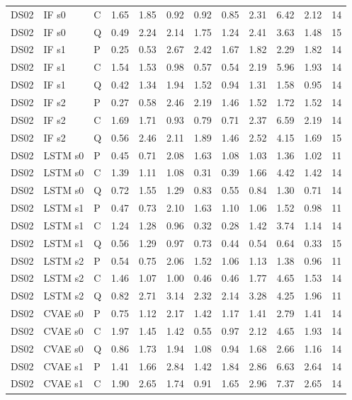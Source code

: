 \documentclass[10pt]{article}
\begin{document}
{\begin{longtable}{lllrrrrrrrrr}
DS02 & IF s0 & C & 1.65 & 1.85 & 0.92 & 0.92 & 0.85 & 2.31 & 6.42 & 2.12 & 14 \\
DS02 & IF s0 & Q & 0.49 & 2.24 & 2.14 & 1.75 & 1.24 & 2.41 & 3.63 & 1.48 & 15 \\
DS02 & IF s1 & P & 0.25 & 0.53 & 2.67 & 2.42 & 1.67 & 1.82 & 2.29 & 1.82 & 14 \\
DS02 & IF s1 & C & 1.54 & 1.53 & 0.98 & 0.57 & 0.54 & 2.19 & 5.96 & 1.93 & 14 \\
DS02 & IF s1 & Q & 0.42 & 1.34 & 1.94 & 1.52 & 0.94 & 1.31 & 1.58 & 0.95 & 14 \\
DS02 & IF s2 & P & 0.27 & 0.58 & 2.46 & 2.19 & 1.46 & 1.52 & 1.72 & 1.52 & 14 \\
DS02 & IF s2 & C & 1.69 & 1.71 & 0.93 & 0.79 & 0.71 & 2.37 & 6.59 & 2.19 & 14 \\
DS02 & IF s2 & Q & 0.56 & 2.46 & 2.11 & 1.89 & 1.46 & 2.52 & 4.15 & 1.69 & 15 \\
DS02 & LSTM s0 & P & 0.45 & 0.71 & 2.08 & 1.63 & 1.08 & 1.03 & 1.36 & 1.02 & 11 \\
DS02 & LSTM s0 & C & 1.39 & 1.11 & 1.08 & 0.31 & 0.39 & 1.66 & 4.42 & 1.42 & 14 \\
DS02 & LSTM s0 & Q & 0.72 & 1.55 & 1.29 & 0.83 & 0.55 & 0.84 & 1.30 & 0.71 & 14 \\
DS02 & LSTM s1 & P & 0.47 & 0.73 & 2.10 & 1.63 & 1.10 & 1.06 & 1.52 & 0.98 & 11 \\
DS02 & LSTM s1 & C & 1.24 & 1.28 & 0.96 & 0.32 & 0.28 & 1.42 & 3.74 & 1.14 & 14 \\
DS02 & LSTM s1 & Q & 0.56 & 1.29 & 0.97 & 0.73 & 0.44 & 0.54 & 0.64 & 0.33 & 15 \\
DS02 & LSTM s2 & P & 0.54 & 0.75 & 2.06 & 1.52 & 1.06 & 1.13 & 1.38 & 0.96 & 11 \\
DS02 & LSTM s2 & C & 1.46 & 1.07 & 1.00 & 0.46 & 0.46 & 1.77 & 4.65 & 1.53 & 14 \\
DS02 & LSTM s2 & Q & 0.82 & 2.71 & 3.14 & 2.32 & 2.14 & 3.28 & 4.25 & 1.96 & 11 \\
DS02 & CVAE s0 & P & 0.75 & 1.12 & 2.17 & 1.42 & 1.17 & 1.41 & 2.79 & 1.41 & 14 \\
DS02 & CVAE s0 & C & 1.97 & 1.45 & 1.42 & 0.55 & 0.97 & 2.12 & 4.65 & 1.93 & 14 \\
DS02 & CVAE s0 & Q & 0.86 & 1.73 & 1.94 & 1.08 & 0.94 & 1.68 & 2.66 & 1.16 & 14 \\
DS02 & CVAE s1 & P & 1.41 & 1.66 & 2.84 & 1.42 & 1.84 & 2.86 & 6.63 & 2.64 & 14 \\
DS02 & CVAE s1 & C & 1.90 & 2.65 & 1.74 & 0.91 & 1.65 & 2.96 & 7.37 & 2.65 & 14 \\

\end{longtable}}
\end{document}
